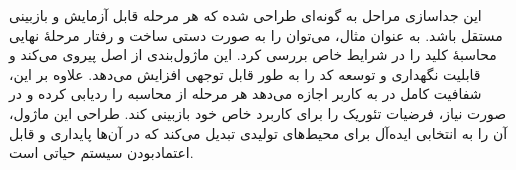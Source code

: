 این جداسازی مراحل به گونه‌ای طراحی شده که هر مرحله قابل آزمایش و بازبینی مستقل باشد. به عنوان مثال، می‌توان  را به صورت دستی ساخت و رفتار مرحلۀ نهایی محاسبۀ کلید را در شرایط خاص بررسی کرد. این ماژول‌بندی از اصل  پیروی می‌کند و قابلیت نگهداری و توسعه کد را به طور قابل توجهی افزایش می‌دهد. علاوه بر این، شفافیت کامل در  به کاربر اجازه می‌دهد هر مرحله از محاسبه را ردیابی کرده و در صورت نیاز، فرضیات تئوریک را برای کاربرد خاص خود بازبینی کند. طراحی  این ماژول، آن را به انتخابی ایده‌آل برای محیط‌های تولیدی تبدیل می‌کند که در آن‌ها پایداری و قابل اعتمادبودن سیستم حیاتی است.
